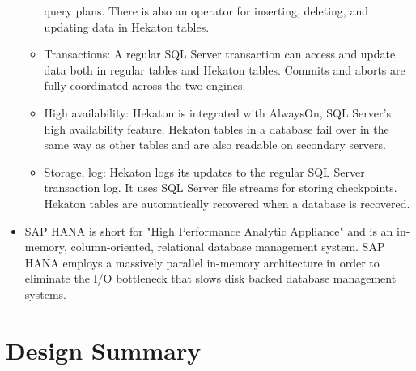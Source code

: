 \documentclass[letterpaper, 12pt]{article}
\renewcommand{\includegraphics}[2][]{\fbox{}}
\begin{document}
\begin{itemize}
\begin{itemize}
		query plans. There is also an operator for inserting, deleting,
		and updating data in Hekaton tables.
		\item Transactions: A regular SQL Server transaction can access
		and update data both in regular tables and Hekaton tables.
		Commits and aborts are fully coordinated across the two engines.
		\item High availability: Hekaton is integrated with AlwaysOn,
		SQL Server’s high availability feature. Hekaton tables in a database
		fail over in the same way as other tables and are also
		readable on secondary servers.
		\item Storage, log: Hekaton logs its updates to the regular SQL
		Server transaction log. It uses SQL Server file streams for storing
		checkpoints. Hekaton tables are automatically recovered
		when a database is recovered. 
	  \end{itemize} \cite{hekaton}
	  
	  \item SAP HANA
	  is short for "High Performance Analytic Appliance" and is an in-memory,
	  column-oriented, relational database management system. SAP HANA employs a
	  massively parallel in-memory architecture in order to eliminate the I/O bottleneck
	  that slows disk backed database management systems.
	  \par\vspace{\baselineskip} 
	  \cite{saphana}
	  \par\vspace{\baselineskip}
	\end{itemize}	
	
\newpage

\section{Design Summary}
\end{document}
